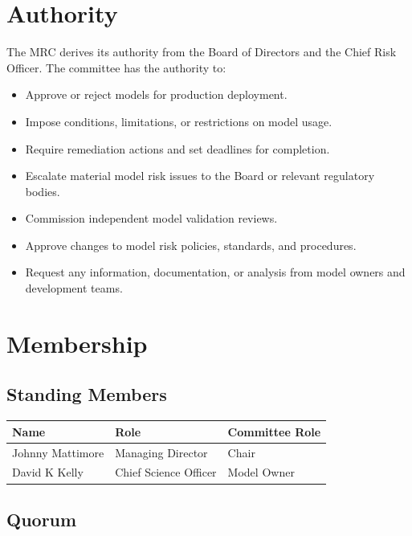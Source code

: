\documentclass[11pt]{article}
\begin{document}
\section{Authority}

The MRC derives its authority from the Board of Directors and the Chief Risk
Officer. The committee has the authority to:

\begin{itemize}
    \item Approve or reject models for production deployment.
    \item Impose conditions, limitations, or restrictions on model usage.
    \item Require remediation actions and set deadlines for completion.
    \item Escalate material model risk issues to the Board or relevant
          regulatory bodies.
    \item Commission independent model validation reviews.
    \item Approve changes to model risk policies, standards, and procedures.
    \item Request any information, documentation, or analysis from model owners
          and development teams.
\end{itemize}

\section{Membership}

\subsection{Standing Members}

\begin{longtable}{p{4cm}p{5cm}p{4cm}}
\toprule
\textbf{Name} & \textbf{Role} & \textbf{Committee Role} \\
\midrule
\endhead
Johnny Mattimore & Managing Director & Chair \\
David K Kelly & Chief Science Officer & Model Owner \\
\bottomrule
\end{longtable}

\subsection{Quorum}
\end{document}
